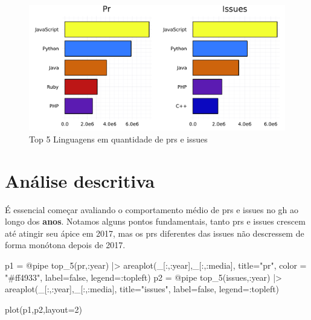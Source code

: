 \documentclass[
  letterpaper,
  DIV=11,
  numbers=noendperiod]{scrartcl}
\newenvironment{Shaded}{\begin{snugshade}}{\end{snugshade}}
\newcommand{\ConstantTok}[1]{\textcolor[rgb]{0.56,0.35,0.01}{#1}}
\newcommand{\FloatTok}[1]{\textcolor[rgb]{0.68,0.00,0.00}{#1}}
\newcommand{\FunctionTok}[1]{\textcolor[rgb]{0.28,0.35,0.67}{#1}}
\newcommand{\NormalTok}[1]{\textcolor[rgb]{0.00,0.23,0.31}{#1}}
\newcommand{\OperatorTok}[1]{\textcolor[rgb]{0.37,0.37,0.37}{#1}}
\newcommand{\PreprocessorTok}[1]{\textcolor[rgb]{0.68,0.00,0.00}{#1}}
\newcommand{\StringTok}[1]{\textcolor[rgb]{0.13,0.47,0.30}{#1}}
\begin{document}
\begin{figure}[H]

{\centering \includegraphics{report_files/figure-pdf/fig-plt-output-1.pdf}

}

\caption{\label{fig-plt}Top 5 Linguagens em quantidade de prs e issues}

\end{figure}

\section{Análise descritiva}

É essencial começar avaliando o comportamento médio de prs e issues no
gh ao longo dos \textbf{anos}. Notamos alguns pontos fundamentais, tanto
prs e issues crescem até atingir seu ápice em 2017, mas os prs
diferentes das issues não descressem de forma monótona depois de 2017.

\begin{Shaded}
\begin{Highlighting}[]
\NormalTok{p1 }\OperatorTok{=} \PreprocessorTok{@pipe} \FunctionTok{top\_5}\NormalTok{(pr,}\OperatorTok{:}\NormalTok{year)  }\OperatorTok{|\textgreater{}}
           \FunctionTok{areaplot}\NormalTok{(\_[}\OperatorTok{:}\NormalTok{,}\OperatorTok{:}\NormalTok{year],\_[}\OperatorTok{:}\NormalTok{,}\OperatorTok{:}\NormalTok{media], title}\OperatorTok{=}\StringTok{"pr"}\NormalTok{, color }\OperatorTok{=} \StringTok{"\#ff4933"}\NormalTok{, }
\NormalTok{           label}\OperatorTok{=}\ConstantTok{false}\NormalTok{, legend}\OperatorTok{=:}\NormalTok{topleft)}
\NormalTok{p2 }\OperatorTok{=} \PreprocessorTok{@pipe} \FunctionTok{top\_5}\NormalTok{(issues,}\OperatorTok{:}\NormalTok{year) }\OperatorTok{|\textgreater{}} 
           \FunctionTok{areaplot}\NormalTok{(\_[}\OperatorTok{:}\NormalTok{,}\OperatorTok{:}\NormalTok{year],\_[}\OperatorTok{:}\NormalTok{,}\OperatorTok{:}\NormalTok{media], title}\OperatorTok{=}\StringTok{"issues"}\NormalTok{, label}\OperatorTok{=}\ConstantTok{false}\NormalTok{, legend}\OperatorTok{=:}\NormalTok{topleft)}
           
\FunctionTok{plot}\NormalTok{(p1,p2,layout}\OperatorTok{=}\FloatTok{2}\NormalTok{)}
\end{Highlighting}
\end{Shaded}
\end{document}
